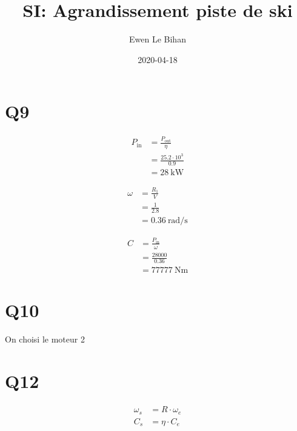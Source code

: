 \documentclass{article}
\title{SI: Agrandissement piste de ski}
\author{Ewen Le Bihan}
\date{2020-04-18}
\begin{document}
\maketitle

\section{Q9}

\begin{equation*}
  \begin{split}
    P_{\text{in}} &= \frac{P_\text{out}}{\eta} \\
                  &= \frac{25.2\cdot10^3}{0.9} \\
                  &= \SI{28}{\kilo\watt}
  \end{split}
\end{equation*}

\begin{equation*}
  \begin{split}
    \omega &= \frac{R_1}{V} \\
           &= \frac{1}{2.8} \\
           &= \SI{0.36}{\radian\per\second}
  \end{split}
\end{equation*}

\begin{equation*}
  \begin{split}
    C &= \frac{P_\text{in}}{\omega} \\
      &= \frac{28 000}{0.36} \\
      &= \SI{77777}{\newton\meter}
  \end{split}
\end{equation*}

\section{Q10}

On choisi le moteur 2

\section{Q12}

\begin{equation*}
  \begin{split}
    \omega_s &= R \cdot \omega_e \\
    C_s &= \eta \cdot C_e
  \end{split}
\end{equation*}
\end{document}
